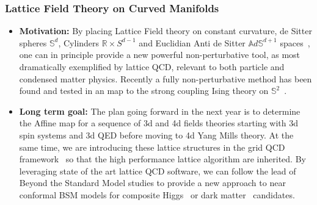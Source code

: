 \documentclass[12pt,hyperpdf]{article}
\begin{document}
\subsubsection{Lattice Field Theory on Curved Manifolds}
\begin{itemize}
   \item{ \bf Motivation:}
 By placing Lattice Field theory on constant curvature, de Sitter spheres
${\mathbb S}^d$, Cylinders ${ \mathbb R} \times S^{d-1}$ and Euclidian Anti de Sitter
${\mathbb A}d\mathbb{S}^{d+1}$ spaces~\cite{Brower:2019kyh,Brower:2020jqj, Cogburn:2022yyb}, one can
in principle provide a new powerful non-perturbative tool, as
most dramatically exemplified  by lattice QCD, relevant to
both particle and condensed matter physics.  
Recently a fully non-perturbative method has been
found and tested in an map to the strong coupling Ising theory on
${ \mathbb S}^2$~\cite{Brower:2022cwv,Owen:2023}. 
 \item { \bf Long term goal:}
The plan going forward in the next year is to determine the Affine map
for a sequence of 3d and 4d fields theories starting with 3d spin systems and 3d QED before moving to 4d Yang Mills theory. At the same time, we are
introducing these lattice structures in the grid QCD
framework~\cite{Boyle:2016lbp} so that the high performance lattice
algorithm are inherited.  By leveraging state of the art lattice QCD
software, we can follow the lead of Beyond the Standard Model studies
to provide a new approach to near conformal BSM models for composite
Higgs~\cite{LSD:2023uzj} or dark matter~\cite{LatticeStrongDynamics:2020jwi} candidates.  
\end{itemize}

\newpage



%

%
%

%
\end{document}
